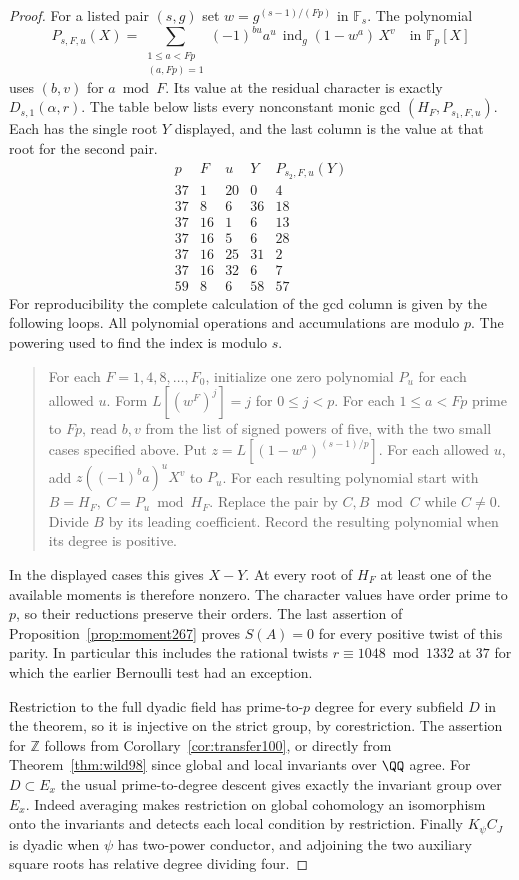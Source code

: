 \documentclass[a4paper,11pt]{article}
\theoremstyle{definition}
\theoremstyle{remark}
\newcommand{\ZZ}{\mathbb Z}\newcommand{\ord}{\operatorname{ord}}
\numberwithin{equation}{section}
\begin{document}
\begin{proof}
For a listed pair \((s,g)\) set \(w=g^{(s-1)/(Fp)}\) in
\(\mathbb F_s\). The polynomial
\[
 P_{s,F,u}(X)=
     \sum_{\substack{1\le a<Fp\\(a,Fp)=1}}
     (-1)^{bu} a^u\,\operatorname{ind}_g(1-w^a)\,X^v
                  \quad\text{in }\mathbb F_p[X]
\]
uses \((b,v)\) for \(a\bmod F\). Its value at the residual
character is exactly \(D_{s,1}(\alpha,r)\). The table below
lists every nonconstant monic gcd \((H_F,P_{s_1,F,u})\).
Each has the single root \(Y\) displayed, and the last column is
the value at that root for the second pair.
\[
\begin{array}{r|r|r|r|r}
p&F&u&Y&P_{s_2,F,u}(Y)\\ \hline
37&1&20&0&4\\
37&8&6&36&18\\
37&16&1&6&13\\
37&16&5&6&28\\
37&16&25&31&2\\
37&16&32&6&7\\
59&8&6&58&57
\end{array}
\]
For reproducibility the complete calculation of the gcd column
is given by the following loops. All polynomial operations and
accumulations are modulo \(p\). The powering used to find the
index is modulo \(s\).
\begin{quote}\small
For each \(F=1,4,8,\ldots,F_0\), initialize one zero
polynomial \(P_u\) for each allowed \(u\). Form
\(L[(w^F)^j]=j\) for \(0\le j<p\). For each
\(1\le a<Fp\) prime to \(Fp\), read \(b,v\) from the list of
signed powers of five, with the two small cases specified above.
Put \(z=L[(1-w^a)^{(s-1)/p}]\). For each allowed \(u\), add
\(z((-1)^ba)^u X^v\) to \(P_u\). For each resulting polynomial
start with \(B=H_F,\ C=P_u\bmod H_F\). Replace the pair by
\(C,B\bmod C\) while \(C\ne0\). Divide \(B\) by its leading
coefficient. Record the resulting polynomial when its
degree is positive.
\end{quote}
In the displayed cases this gives \(X-Y\). At every root of
\(H_F\) at least one of the available moments is therefore
nonzero. The character values have order prime to \(p\), so
their reductions preserve their orders. The last assertion
of Proposition~\ref{prop:moment267} proves \(S(A)=0\) for
every positive twist of this parity. In particular this
includes the rational twists \(r\equiv1048\bmod1332\) at
\(37\) for which the earlier Bernoulli test had an exception.

Restriction to the full dyadic field has prime-to-\(p\)
degree for every subfield \(D\) in the theorem, so it is
injective on the strict group, by corestriction.
The assertion for \(\ZZ\) follows from
Corollary~\ref{cor:transfer100}, or directly from
Theorem~\ref{thm:wild98} since global and local invariants
over \(\QQ\) agree. For \(D\subset E_x\) the usual
prime-to-degree descent gives exactly the invariant group
over \(E_x\). Indeed averaging makes restriction on global
cohomology an isomorphism onto the invariants and detects
each local condition by restriction. Finally \(K_\psi C_J\)
is dyadic when \(\psi\) has two-power conductor, and adjoining
the two auxiliary square roots has relative degree dividing four.
\end{proof}
\end{document}
